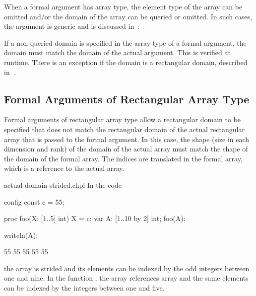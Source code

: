 %

When a formal argument has array type, the element type of the array
can be omitted and/or the domain of the array can be queried or
omitted.  In such cases, the argument is generic and is discussed
in~.

If a non-queried domain is specified in the array type of a formal
argument, the domain must match the domain of the actual argument.
This is verified at runtime.  There is an exception if the domain is
a rectangular domain, described
in~.


\subsection{Formal Arguments of Rectangular Array Type}
\label{Formal_Arguments_of_Rectangular_Array_Type}

Formal arguments of rectangular array type allow a rectangular domain
to be specified that does not match the rectangular domain of the
actual rectangular array that is passed to the formal argument.  In
this case, the shape (size in each dimension and rank) of the domain
of the actual array must match the shape of the domain of the formal
array.  The indices are translated in the formal array, which is a
reference to the actual array.

\begin{chapelexample}{actual-domain-strided.chpl}
In the code
\begin{chapelpre}
config const c = 55;
\end{chapelpre}
\begin{chapel}
proc foo(X: [1..5] int) { X = c; }
var A: [1..10 by 2] int;
foo(A);
\end{chapel}
\begin{chapelpost}
writeln(A);
\end{chapelpost}
\begin{chapeloutput}
55 55 55 55 55
\end{chapeloutput}
the array  is strided and its elements can be indexed by the
odd integers between one and nine.  In the function , the
array  references array  and the same elements can be
indexed by the integers between one and five.
\end{chapelexample}


